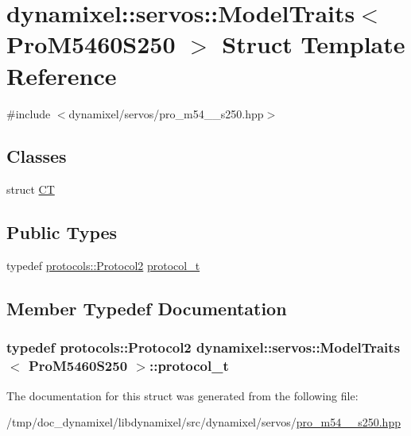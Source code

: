 \hypertarget{structdynamixel_1_1servos_1_1_model_traits_3_01_pro_m5460_s250_01_4}{}\section{dynamixel\+:\+:servos\+:\+:Model\+Traits$<$ Pro\+M5460\+S250 $>$ Struct Template Reference}
\label{structdynamixel_1_1servos_1_1_model_traits_3_01_pro_m5460_s250_01_4}


{\ttfamily \#include $<$dynamixel/servos/pro\+\_\+m54\+\_\+\_\+s250.\+hpp$>$}

\subsection*{Classes}
\begin{DoxyCompactItemize}
\item 
struct \hyperlink{structdynamixel_1_1servos_1_1_model_traits_3_01_pro_m5460_s250_01_4_1_1_c_t}{C\+T}
\end{DoxyCompactItemize}
\subsection*{Public Types}
\begin{DoxyCompactItemize}
\item 
typedef \hyperlink{classdynamixel_1_1protocols_1_1_protocol2}{protocols\+::\+Protocol2} \hyperlink{structdynamixel_1_1servos_1_1_model_traits_3_01_pro_m5460_s250_01_4_a6f40001a9ef73dd09907f4af6dc74783}{protocol\+\_\+t}
\end{DoxyCompactItemize}


\subsection{Member Typedef Documentation}
\hypertarget{structdynamixel_1_1servos_1_1_model_traits_3_01_pro_m5460_s250_01_4_a6f40001a9ef73dd09907f4af6dc74783}{}
\subsubsection[{protocol\+\_\+t}]{\setlength{\rightskip}{0pt plus 5cm}typedef {\bf protocols\+::\+Protocol2} {\bf dynamixel\+::servos\+::\+Model\+Traits}$<$ {\bf Pro\+M5460\+S250} $>$\+::{\bf protocol\+\_\+t}}\label{structdynamixel_1_1servos_1_1_model_traits_3_01_pro_m5460_s250_01_4_a6f40001a9ef73dd09907f4af6dc74783}


The documentation for this struct was generated from the following file\+:\begin{DoxyCompactItemize}
\item 
/tmp/doc\+\_\+dynamixel/libdynamixel/src/dynamixel/servos/\hyperlink{pro__m54__60__s250_8hpp}{pro\+\_\+m54\+\_\+\_\+s250.\+hpp}\end{DoxyCompactItemize}
